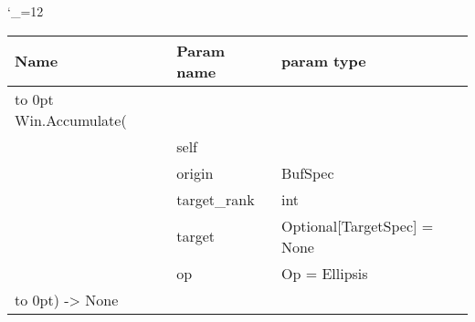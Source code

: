 \begingroup \catcode`\_=12 \tt
\begin{tabular}{lll}
\toprule
\textrm{Name}&\textrm{Param name}&\textrm{param type}\\
\midrule
\hbox to 0pt {Win.Accumulate(\hss}\\
& self\\
& origin & BufSpec\\
& target_rank & int\\
& target & Optional[TargetSpec] = None\\
& op & Op = Ellipsis\\
\hbox to 0pt{) -> None\hss}\\
\bottomrule
\end{tabular}
\endgroup
